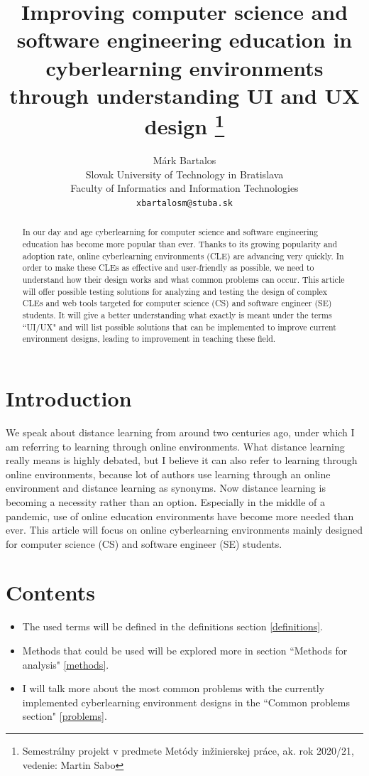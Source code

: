 \documentclass[10pt,english,a4paper]{article}
\title{Improving computer science and software 
engineering education in cyberlearning 
environments through understanding UI and UX design
\thanks{Semestrálny projekt v predmete Metódy inžinierskej práce,
 ak. rok 2020/21, vedenie: Martin Sabo}}
\author{Márk Bartalos \\[2pt]
        \small{Slovak University of Technology in Bratislava}\\
        \small{Faculty of Informatics and Information Technologies}\\
        \small{\texttt{xbartalosm@stuba.sk}}
}
\begin{document}
\maketitle

\begin{abstract}
    In our day and age cyberlearning for computer science and software engineering education has become more popular than ever.
    Thanks to its growing popularity and adoption rate, online cyberlearning environments (CLE) are advancing very quickly.
    In order to make these CLEs as effective and user-friendly as possible, we need to understand how their design
    works and what common problems can occur. This article will offer possible testing solutions for analyzing and testing
    the design of complex CLEs and web tools targeted for computer science (CS) and software engineer (SE) students. 
    It will give a better understanding what exactly is meant under the terms ``UI/UX" and will list possible solutions that
    can be implemented to improve current environment designs, leading to improvement in teaching these field.
\end{abstract}



\section{Introduction}
We speak about distance learning from around two centuries ago, under which
I am referring to learning through online environments\cite{moore_2011_elearning}. What distance learning really means is highly debated,
but I believe it can also refer to learning through online environments, because lot of authors use learning through an online environment and distance learning as
synonyms\cite{moore_2011_elearning}\cite{distance_definition}. 
Now distance learning is becoming a necessity rather than an option. Especially in the middle of a pandemic, use of online 
education environments have become more needed than ever. This article will focus on online cyberlearning environments 
mainly designed for computer science (CS) and software engineer (SE) students.

\section{Contents}

\begin{itemize}
     \item The used terms will be defined in the definitions section \ref{definitions}.
     \item Methods that could be used will be explored more in section ``Methods for analysis" \ref{methods}.
     \item I will talk more about the most common problems with the currently implemented cyberlearning environment designs in the ``Common problems section" \ref{problems}.
\end{itemize}
\end{document}
